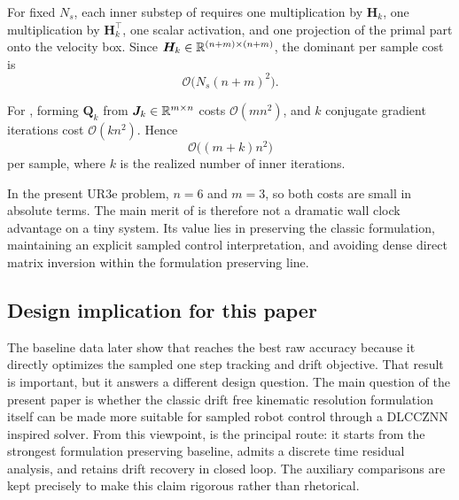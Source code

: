 For fixed $N_s$, each inner substep of \methodtwoDL{} requires one multiplication by $\bm{H}_k$, one multiplication by $\bm{H}_k^\top$, one scalar activation, and one projection of the primal part onto the velocity box. Since $\bm{H}_k \in \mathbb{R}^{(n+m)\times(n+m)}$, the dominant per sample cost is
\begin{equation}
  \mathcal{O}\!\bigl(N_s(n+m)^2\bigr).
  \label{eq:method2_complexity}
\end{equation}

For \methodthreepcg{}, forming $\bm{Q}_k$ from $\bm{J}_k \in \mathbb{R}^{m\times n}$ costs $\mathcal{O}(mn^2)$, and $k$ conjugate gradient iterations cost $\mathcal{O}(kn^2)$. Hence
\begin{equation}
  \mathcal{O}\!\bigl((m+k)n^2\bigr)
\end{equation}
per sample, where $k$ is the realized number of inner iterations.

In the present UR3e problem, $n=6$ and $m=3$, so both costs are small in absolute terms. The main merit of \methodtwoDL{} is therefore not a dramatic wall clock advantage on a tiny system. Its value lies in preserving the classic formulation, maintaining an explicit sampled control interpretation, and avoiding dense direct matrix inversion within the formulation preserving line.

\subsection{Design implication for this paper}

The baseline data later show that \methodthree{} reaches the best raw accuracy because it directly optimizes the sampled one step tracking and drift objective. That result is important, but it answers a different design question. The main question of the present paper is whether the classic drift free kinematic resolution formulation itself can be made more suitable for sampled robot control through a DLCCZNN inspired solver. From this viewpoint, \methodtwoDL{} is the principal route: it starts from the strongest formulation preserving baseline, admits a discrete time residual analysis, and retains drift recovery in closed loop. The auxiliary comparisons are kept precisely to make this claim rigorous rather than rhetorical.
